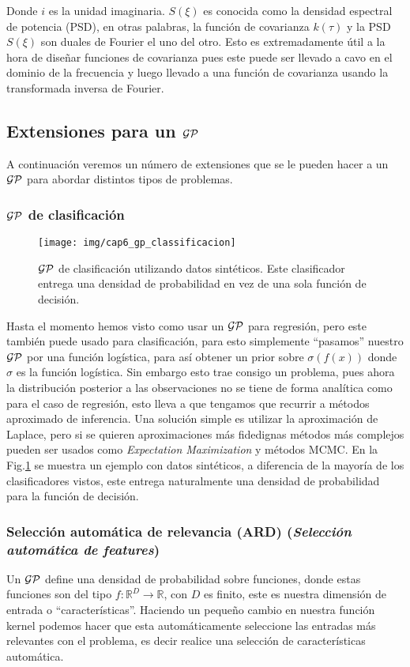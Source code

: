 Donde $i$ es la unidad imaginaria. $S(\xi)$ es conocida como la densidad espectral de potencia (PSD), en otras palabras, la función de covarianza $k(\tau)$ y la PSD $S(\xi)$ son duales de Fourier el uno del otro. Esto es extremadamente útil a la hora de diseñar funciones de covarianza pues este puede ser llevado a cavo en el dominio de la frecuencia y luego llevado a una función de covarianza usando la transformada inversa de Fourier.

\subsection{Extensiones para un $\mathcal{GP}$}
A continuación veremos un número de extensiones que se le pueden hacer a un $\mathcal{GP}$ para abordar distintos tipos de problemas.

\subsubsection{$\mathcal{GP}$ de clasificación}

\begin{wrapfigure}{r}{0.38\textwidth}
\texttt{[image: img/cap6\_gp\_classificacion]}
\caption{$\mathcal{GP}$ de clasificación utilizando datos sintéticos. Este clasificador entrega una densidad de probabilidad en vez de una sola función de decisión.}\label{fig:gp_8}
\end{wrapfigure} 

Hasta el momento hemos visto como usar un $\mathcal{GP}$ para regresión, pero este también puede usado para clasificación, para esto simplemente ``pasamos'' nuestro $\mathcal{GP}$ por una función logística, para así obtener un prior sobre $\sigma\left(f(x)\right)$ donde $\sigma$ es la función logística. Sin embargo esto trae consigo un problema, pues ahora la distribución posterior a las observaciones no se tiene de forma analítica como para el caso de regresión, esto lleva a que tengamos que recurrir a métodos aproximado de inferencia. Una solución simple es utilizar la aproximación de Laplace, pero si se quieren aproximaciones más fidedignas métodos más complejos pueden ser usados como \textit{Expectation Maximization} y métodos MCMC. En la Fig.\ref{fig:gp_8} se muestra un ejemplo con datos sintéticos, a diferencia de la mayoría de los clasificadores vistos, este entrega naturalmente una densidad de probabilidad para la función de decisión.\\



\subsubsection{Selección automática de relevancia (ARD) (\textit{Selección automática de features})}
Un $\mathcal{GP}$ define una densidad de probabilidad sobre funciones, donde estas funciones son del tipo $f: \mathbb{R}^D \rightarrow \mathbb{R}$, con $D$ es finito, este es nuestra dimensión de entrada o ``características''. Haciendo un pequeño cambio en nuestra función kernel podemos hacer que esta automáticamente seleccione las entradas más relevantes con el problema, es decir realice una selección de características automática.\\

